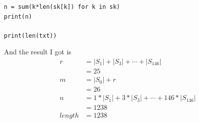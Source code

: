 \documentclass[preprint,12pt]{elsarticle}
\begin{document}
\begin{enumerate}[label=\alph*]
\begin{lstlisting}
n = sum(k*len(sk[k]) for k in sk)
print(n)

print(len(txt))
    \end{lstlisting}
    And the result I got is
    \begin{align*}
        r   &= |S_1| + |S_3| + \cdots + |S_146| \\
            &= 25 \\
        m   &= |S_0| + r \\
            &= 26 \\
        n   &= 1 * |S_1| + 3 * |S_3| + \cdots + 146 * |S_146| \\
            &= 1238 \\
        length &= 1238
    \end{align*}
    \end{enumerate} 
\end{document}
